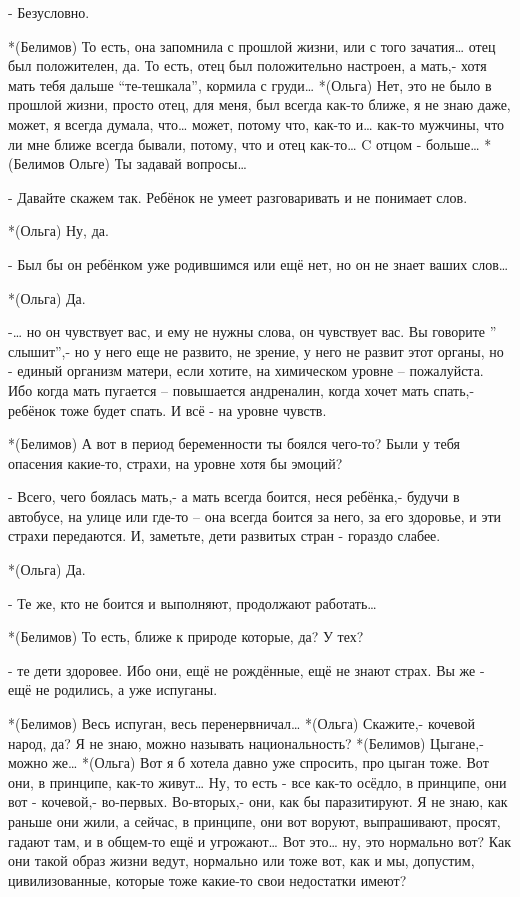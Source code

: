 - Безусловно.

*(Белимов) То есть, она запомнила с прошлой жизни, или с того зачатия… отец был положителен, да. То есть, отец был положительно настроен, а мать,- хотя мать тебя дальше “те-тешкала”, кормила с груди…
*(Ольга) Нет, это не было в прошлой жизни, просто отец, для меня, был всегда как-то ближе, я не знаю даже, может, я всегда думала, что… может, потому что, как-то и… как-то мужчины, что ли мне ближе всегда бывали, потому, что и отец как-то… C отцом - больше…
*(Белимов Ольге) Ты задавай вопросы…

- Давайте скажем так. Ребёнок не умеет разговаривать и не понимает слов. 

*(Ольга) Ну, да.

- Был бы он ребёнком уже родившимся или ещё нет, но он не знает ваших слов…

*(Ольга) Да.

-… но он чувствует вас, и ему не нужны слова, он чувствует вас. Вы говорите ” слышит”,- но у него еще не развито, не зрение, у него не развит этот органы, но - единый организм матери, если хотите, на химическом уровне – пожалуйста. Ибо когда мать пугается – повышается андреналин, когда хочет мать спать,- ребёнок тоже будет спать. И всё - на уровне чувств.

*(Белимов) А вот в период беременности ты боялся чего-то? Были у тебя опасения какие-то, страхи, на уровне хотя бы эмоций?

- Всего, чего боялась мать,- а мать всегда боится, неся ребёнка,- будучи в автобусе, на улице или где-то – она всегда боится за него, за его здоровье, и эти страхи передаются. И, заметьте, дети развитых стран - гораздо слабее.

*(Ольга) Да.

- Те же, кто не боится и выполняют, продолжают работать…

*(Белимов) То есть, ближе к природе которые, да? У тех?

- те дети здоровее. Ибо они, ещё не рождённые, ещё не знают страх. Вы же - ещё не родились, а уже испуганы.

*(Белимов) Весь испуган, весь перенервничал…
*(Ольга) Скажите,- кочевой народ, да? Я не знаю, можно называть национальность?
*(Белимов) Цыгане,-  можно же…
*(Ольга) Вот я б хотела давно уже спросить, про цыган тоже. Вот они, в принципе, как-то живут… Ну, то есть - все как-то осёдло, в принципе, они вот - кочевой,- во-первых. Во-вторых,- они, как бы паразитируют. Я не знаю, как раньше они жили, а сейчас, в принципе, они вот воруют, выпрашивают, просят, гадают там, и в общем-то ещё и угрожают… Вот это… ну, это нормально вот? Как они такой образ жизни ведут, нормально или тоже вот, как и мы, допустим, цивилизованные, которые тоже какие-то свои недостатки имеют?

